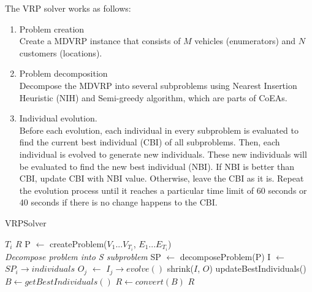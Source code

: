\documentclass[conference]{IEEEtran}
\begin{document}
The VRP solver works as follows:
\begin{enumerate}
	\item Problem creation \\
	Create a MDVRP instance that consists of $M$ vehicles (enumerators) and $N$ customers (locations).
	\item Problem decomposition \\
	Decompose the MDVRP into several subproblems using Nearest Insertion Heuristic (NIH) and Semi-greedy algorithm, which are parts of CoEAs. 
	\item Individual evolution. \\
	Before each evolution, each individual in every subproblem is evaluated to find the current best individual (CBI) of all subproblems. Then, each individual is evolved to generate new individuals. These new individuals will be evaluated to find the new best individual (NBI). If NBI is better than CBI, update CBI with NBI value. Otherwise, leave the CBI as it is. Repeat the evolution process until it reaches a particular time limit of 60 seconds or 40 seconds if there is no change happens to the CBI.    
\end{enumerate}


\begin{algorithm}[!]
	\caption{VRPSolver}
	\label{alg:vrp-solver}
	\begin{algorithmic}[1]
		\renewcommand{\algorithmicrequire}{\textbf{Input:}}
		\renewcommand{\algorithmicensure}{\textbf{Output:}}
		\REQUIRE $T_i$
		\ENSURE  $R$
		\STATE P $\leftarrow$ createProblem($V_1...V_{T_i}$, $E_1...E_{T_i}$)
		\\ \textit{Decompose problem into S subproblem}
		\STATE SP $\leftarrow$ decomposeProblem(P)
				\STATE I $\leftarrow$ $SP_i \rightarrow individuals$
					\STATE $O_j$ $\leftarrow$ $I_j \rightarrow evolve()$
				\ENDFOR
				\STATE shrink($I$, $O$)
			\ENDFOR
			\STATE updateBestIndividuals()
		\ENDWHILE
		\STATE $B \leftarrow getBestIndividuals()$ 
		\STATE $R \leftarrow convert(B)$ 
		\RETURN $R$
	\end{algorithmic}
\end{algorithm}


\end{document}
